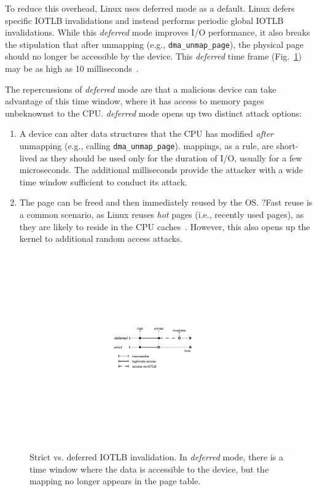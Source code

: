 To reduce this overhead, Linux uses deferred mode as a default. Linux defers specific IOTLB invalidations and instead performs periodic global IOTLB invalidations. While this \emph{deferred} mode improves I/O performance, it also breaks the stipulation that after unmapping (e.g., \texttt{dma\_unmap\_page}), the physical page should no longer be accessible by the device. This \emph{deferred} time frame (Fig.~\ref{fig:deferred}) may be as high as 10 milliseconds~\cite{MSMT18}.

The repercussions of \emph{deferred} mode are that a malicious device can take advantage of this time window, where it has access to memory pages unbeknownst to the CPU. \emph{deferred} mode opens up two distinct attack options:

\begin{enumerate}[labelindent=0pt]
    \item A device can alter data structures that the CPU has modified \emph{after} unmapping (e.g., calling \texttt{dma\_unmap\_page}).
    \iova{} mappings, as a rule, are short-lived as they should be used only for the duration of I/O, usually for a few microseconds. The additional milliseconds provide the attacker with a wide time window sufficient to conduct its attack.
    \item The page can be freed and then immediately reused by the OS. ?Fast reuse is a common scenario, as Linux reuses \emph{hot} pages (i.e., recently used pages), as they are likely to reside in the CPU caches~\cite{hotcold}. However, this also opens up the kernel to additional random access attacks.
\end{enumerate}



\begin{figure}[t]
    \centering
    \includegraphics[width=0.75\columnwidth]{figs/strict.pdf}
    \caption{Strict vs. deferred IOTLB invalidation. In \emph{deferred} mode, there is a time window where the data is accessible to the device, but the mapping no longer appears in the page table.}
    \label{fig:deferred}
\end{figure}

